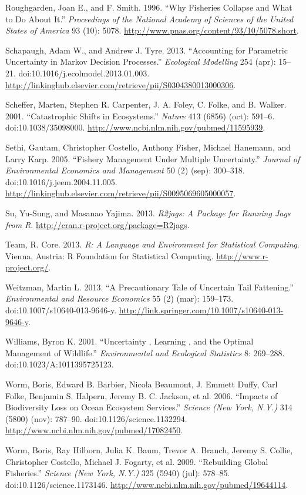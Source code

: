 \documentclass[author-year, review]{elsarticle} %
\begin{document}
Roughgarden, Joan E., and F. Smith. 1996. ``Why Fisheries Collapse and
What to Do About It.'' \emph{Proceedings of the National Academy of
Sciences of the United States of America} 93 (10): 5078.
\url{http://www.pnas.org/content/93/10/5078.short}.

Schapaugh, Adam W., and Andrew J. Tyre. 2013. ``Accounting for
Parametric Uncertainty in Markov Decision Processes.'' \emph{Ecological
Modelling} 254 (apr): 15--21. doi:10.1016/j.ecolmodel.2013.01.003.
\url{http://linkinghub.elsevier.com/retrieve/pii/S0304380013000306}.

Scheffer, Marten, Stephen R. Carpenter, J. A. Foley, C. Folke, and B.
Walker. 2001. ``Catastrophic Shifts in Ecosystems.'' \emph{Nature} 413
(6856) (oct): 591--6. doi:10.1038/35098000.
\url{http://www.ncbi.nlm.nih.gov/pubmed/11595939}.

Sethi, Gautam, Christopher Costello, Anthony Fisher, Michael Hanemann,
and Larry Karp. 2005. ``Fishery Management Under Multiple Uncertainty.''
\emph{Journal of Environmental Economics and Management} 50 (2) (sep):
300--318. doi:10.1016/j.jeem.2004.11.005.
\url{http://linkinghub.elsevier.com/retrieve/pii/S0095069605000057}.

Su, Yu-Sung, and Masanao Yajima. 2013. \emph{R2jags: A Package for
Running Jags from R}. \url{http://cran.r-project.org/package=R2jags}.

Team, R. Core. 2013. \emph{R: A Language and Environment for Statistical
Computing}. Vienna, Austria: R Foundation for Statistical Computing.
\url{http://www.r-project.org/}.

Weitzman, Martin L. 2013. ``A Precautionary Tale of Uncertain Tail
Fattening.'' \emph{Environmental and Resource Economics} 55 (2) (mar):
159--173. doi:10.1007/s10640-013-9646-y.
\url{http://link.springer.com/10.1007/s10640-013-9646-y}.

Williams, Byron K. 2001. ``Uncertainty , Learning , and the Optimal
Management of Wildlife.'' \emph{Environmental and Ecological Statistics}
8: 269--288. doi:10.1023/A:1011395725123.

Worm, Boris, Edward B. Barbier, Nicola Beaumont, J. Emmett Duffy, Carl
Folke, Benjamin S. Halpern, Jeremy B. C. Jackson, et al. 2006. ``Impacts
of Biodiversity Loss on Ocean Ecosystem Services.'' \emph{Science (New
York, N.Y.)} 314 (5800) (nov): 787--90. doi:10.1126/science.1132294.
\url{http://www.ncbi.nlm.nih.gov/pubmed/17082450}.

Worm, Boris, Ray Hilborn, Julia K. Baum, Trevor A. Branch, Jeremy S.
Collie, Christopher Costello, Michael J. Fogarty, et al. 2009.
``Rebuilding Global Fisheries.'' \emph{Science (New York, N.Y.)} 325
(5940) (jul): 578--85. doi:10.1126/science.1173146.
\url{http://www.ncbi.nlm.nih.gov/pubmed/19644114}.
\end{document}
